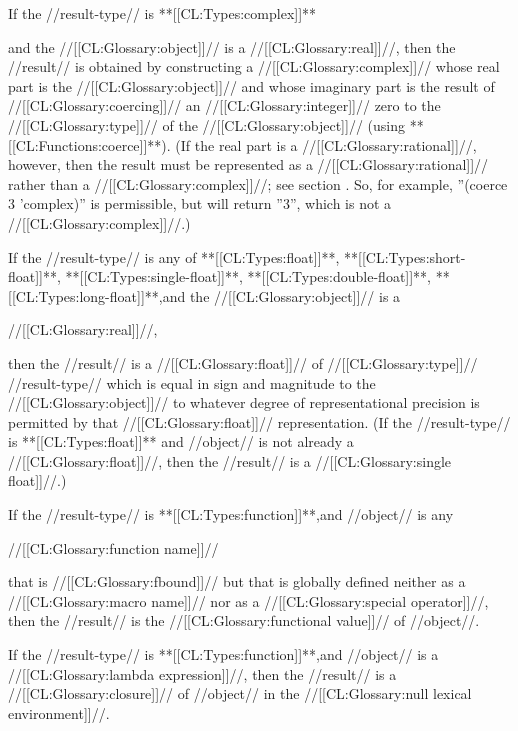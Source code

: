 
If the //result-type// is **[[CL:Types:complex]]**

and the //[[CL:Glossary:object]]// is a //[[CL:Glossary:real]]//, then the //result// is obtained by constructing a //[[CL:Glossary:complex]]// whose real part is the //[[CL:Glossary:object]]// and whose imaginary part is the result of //[[CL:Glossary:coercing]]// an //[[CL:Glossary:integer]]// zero to the //[[CL:Glossary:type]]// of the //[[CL:Glossary:object]]// (using **[[CL:Functions:coerce]]**). (If the real part is a //[[CL:Glossary:rational]]//, however, then the result must be represented as a //[[CL:Glossary:rational]]// rather than a //[[CL:Glossary:complex]]//; see section {\secref\RuleOfCanonRepForComplexRationals}. So, for example, ''(coerce 3 'complex)'' is permissible, but will return ''3'', which is not a //[[CL:Glossary:complex]]//.)


If the //result-type// is any of **[[CL:Types:float]]**, **[[CL:Types:short-float]]**, **[[CL:Types:single-float]]**, **[[CL:Types:double-float]]**, **[[CL:Types:long-float]]**,and the //[[CL:Glossary:object]]// is a

//[[CL:Glossary:real]]//,

then the //result// is a //[[CL:Glossary:float]]// of //[[CL:Glossary:type]]// //result-type// which is equal in sign and magnitude to the //[[CL:Glossary:object]]// to whatever degree of representational precision is permitted by that //[[CL:Glossary:float]]// representation. (If the //result-type// is **[[CL:Types:float]]** and //object// is not already a //[[CL:Glossary:float]]//, then the //result// is a //[[CL:Glossary:single float]]//.)


If the //result-type// is **[[CL:Types:function]]**,and //object// is any

//[[CL:Glossary:function name]]//

that is //[[CL:Glossary:fbound]]// but that is globally defined neither as a //[[CL:Glossary:macro name]]// nor as a //[[CL:Glossary:special operator]]//, then the //result// is the //[[CL:Glossary:functional value]]// of //object//.

If the //result-type// is **[[CL:Types:function]]**,and //object// is a //[[CL:Glossary:lambda expression]]//, then the //result// is a //[[CL:Glossary:closure]]// of //object// in the //[[CL:Glossary:null lexical environment]]//.

